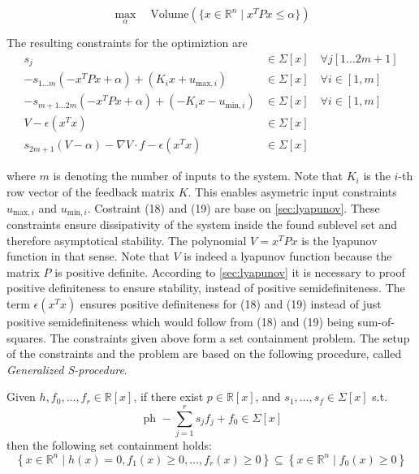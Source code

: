 \documentclass[10pt,a4paper]{article}
\begin{document}
\begin{equation}
\label{eq:sos_problem}
\max\limits_{\alpha} \quad \text{Volume}\left(\{x \in \mathbb{R}^n \mid x^TPx \leq \alpha \}\right)
\end{equation}

The resulting constraints for the optimiztion are
\begin{align}
	s_{j} &\in \Sigma[x] \quad \forall j [1 \dots 2m+1]\\
	-s_{1 \dots m}(-x^TPx + \alpha) + (K_i x + u_{\text{max},i}) &\in \Sigma[x] \quad \forall i \in [1,m]\\
	-s_{m+1 \dots 2m}(-x^TPx + \alpha) + (-K_i x - u_{\text{min},i}) &\in \Sigma[x] \quad \forall i \in [1,m]\\
	V - \epsilon (x^Tx) &\in \Sigma[x]\\
	s_{2m+1}(V-\alpha) - \nabla V \cdot f - \epsilon (x^Tx) &\in \Sigma[x]
\end{align}

where $m$ is denoting the number of inputs to the system. Note that $K_i$ is the $i$-th row vector of the feedback matrix $K$. This enables
asymetric input constraints $u_{\text{max},i}$ and $u_{\text{min},i}$. Costraint (18) and (19) are base on \ref{sec:lyapunov}. These constraints ensure dissipativity of the system inside the found sublevel set and
therefore asymptotical stability. The polynomial $V=x^TPx$ is the lyapunov function in that sense. Note that $V$ is indeed a lyapunov function because the matrix 
$P$ is positive definite. According to \ref{sec:lyapunov} it is necessary to proof positive definiteness to ensure stability, instead of
positive semidefiniteness. The term $\epsilon (x^Tx)$ ensures positive definiteness for (18) and (19) instead of just positive semidefiniteness which would follow
from (18) and (19) being sum-of-squares. The constraints given above form a set containment problem. The setup of the constraints and the problem are based on the
following procedure, called \textit{Generalized S-procedure}.

\begin{tcolorbox}[colback=gray!20, colframe=gray!80,title=Generalized S-procedure \cite{loureiro2023presentation},arc=0.2mm]        
Given $h, f_0, \ldots, f_r \in \mathbb{R}[x]$, if there exist $p \in \mathbb{R}[x]$, and $s_1, \ldots, s_f \in \Sigma[x]$ s.t.
\begin{equation}
	\text { ph }-\sum_{j=1}^r s_j f_j+f_0 \in \Sigma[x]
\end{equation}
then the following set containment holds:
\begin{equation}
	\left\{x \in \mathbb{R}^n \mid h(x)=0, f_1(x) \geq 0, \ldots, f_r(x) \geq 0\right\} \subseteq\left\{x \in \mathbb{R}^n \mid f_0(x) \geq 0\right\}
\end{equation}
\end{tcolorbox}
\end{document}
